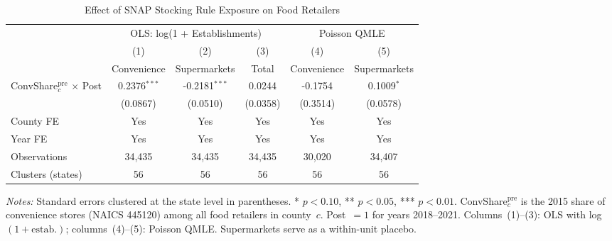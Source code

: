 
\begin{table}[H]
\centering
\caption{Effect of SNAP Stocking Rule Exposure on Food Retailers}
\label{tab:main}
\begin{adjustbox}{max width=\textwidth}
\begin{threeparttable}
\begin{tabular}{lccccc}
\toprule
& \multicolumn{3}{c}{OLS: log(1 + Establishments)} & \multicolumn{2}{c}{Poisson QMLE} \\
\cmidrule(lr){2-4} \cmidrule(lr){5-6}
& (1) & (2) & (3) & (4) & (5) \\
& Convenience & Supermarkets & Total & Convenience & Supermarkets \\
\midrule
ConvShare$_{c}^{\text{pre}}$ $\times$ Post & 0.2376$^{***}$ & -0.2181$^{***}$ & 0.0244 & -0.1754 & 0.1009$^{*}$ \\
& (0.0867) & (0.0510) & (0.0358) & (0.3514) & (0.0578) \\[4pt]
County FE & Yes & Yes & Yes & Yes & Yes \\
Year FE & Yes & Yes & Yes & Yes & Yes \\
Observations & 34,435 & 34,435 & 34,435 & 30,020 & 34,407 \\
Clusters (states) & 56 & 56 & 56 & 56 & 56 \\
\bottomrule
\end{tabular}
\begin{tablenotes}[flushleft]
\small
\item \textit{Notes:} Standard errors clustered at the state level in parentheses. * $p<0.10$, ** $p<0.05$, *** $p<0.01$. ConvShare$_{c}^{\text{pre}}$ is the 2015 share of convenience stores (NAICS 445120) among all food retailers in county~$c$. Post~$= 1$ for years 2018--2021. Columns~(1)--(3): OLS with log$(1 + \text{estab.})$; columns~(4)--(5): Poisson QMLE. Supermarkets serve as a within-unit placebo.
\end{tablenotes}
\end{threeparttable}
\end{adjustbox}
\end{table}

